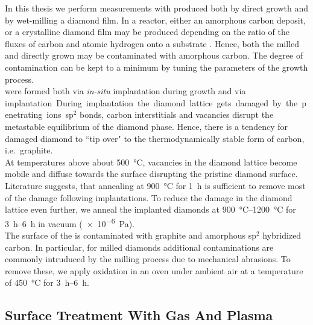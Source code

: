 				In this thesis we perform measurements with \nds produced both by direct \CVD growth and by wet-milling a \CVD diamond film.
				In a \cvd reactor, either an amorphous carbon deposit, or a crystalline diamond film may be produced depending on the ratio of the fluxes of carbon and atomic hydrogen onto a substrate \cite{Ford1995,Olson1993}.
				Hence, both the milled and directly grown \nds may be contaminated with amorphous carbon.
				The degree of contamination can be kept to a minimum by tuning the parameters of the growth process.
				\\
				\sivs were formed both via \textit{in-situ} implantation during \CVD growth and via \si implantation.
				During \si implantation the diamond lattice gets damaged by the penetrating ions.
				sp$^2$ bonds, carbon interstitials and vacancies disrupt the metastable equilibrium of the diamond phase. 
				Hence, there is a tendency for damaged diamond to ``tip over" to the thermodynamically stable form of carbon, i.e.\ graphite.
				\\
				At temperatures above about \SI{500}{\celsius}, vacancies in the diamond lattice become mobile and diffuse towards the surface\cite{Dresselhaus1992} disrupting the pristine diamond surface.
				Literature suggests, that annealing at \SI{900}{\celsius} for \SI{1}{\hour} is sufficient to remove most of the damage following implantations.
				To reduce the damage in the diamond lattice even further, we anneal the implanted diamonds at \SIrange{900}{1200}{\celsius} for \SIrange{3}{6}{h} in vacuum (\SI{e-6}{Pa}).
				\\
				The surface of the \nds is contaminated with graphite and amorphous sp$^2$ hybridized carbon. In particular, for milled diamonds additional contaminations are commonly intruduced by the milling process due to mechanical abrasions. To remove these, we apply oxidation in an oven under ambient air at a temperature of \SI{450}{\celsius} for \SIrange{3}{6}{h}.

			\subsection{Surface Treatment With Gas And Plasma}\label{subsection::plasma}

